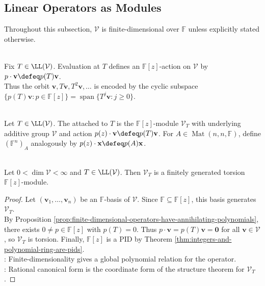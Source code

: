 \subsection{Linear Operators as Modules}

Throughout this subsection, $\mathcal{V}$ is finite-dimensional over $\mathbb{F}$ unless explicitly stated otherwise.

\begin{perspective} \label{per:operator-as-polynomial-action} \\
Fix $T\in\LL(\mathcal{V})$. Evaluation at $T$ defines an $\mathbb{F}[z]$-action on $\mathcal{V}$ by $p\cdot\mathbf{v}\defeq p(T)\mathbf{v}$.\\
Thus the orbit $\mathbf{v},T\mathbf{v},T^2\mathbf{v},\ldots$ is encoded by the cyclic subspace $\{p(T)\mathbf{v}:p\in\mathbb{F}[z]\}=\operatorname{span}\{T^j\mathbf{v}:j\geq0\}$.
\end{perspective}

\begin{definition} \label{def:operator-module-and-matrix-module} \\
Let $T\in\LL(\mathcal{V})$. The  attached to $T$ is the $\mathbb{F}[z]$-module $\mathcal{V}_T$ with underlying additive group $\mathcal{V}$ and action $p(z)\cdot\mathbf{v}\defeq p(T)\mathbf{v}$.
For $A\in\operatorname{Mat}(n,n,\mathbb{F})$, define $(\mathbb{F}^n)_A$ analogously by $p(z)\cdot\mathbf{x}\defeq p(A)\mathbf{x}$.
\end{definition}

\begin{proposition} \label{prop:operator-modules-are-fg-torsion} \\
Let $0<\dim\mathcal{V}<\infty$ and $T\in\LL(\mathcal{V})$. Then $\mathcal{V}_T$ is a finitely generated torsion $\mathbb{F}[z]$-module.
\begin{proof}
Let $(\mathbf{v}_1,\ldots,\mathbf{v}_n)$ be an $\mathbb{F}$-basis of $\mathcal{V}$. Since $\mathbb{F}\subseteq\mathbb{F}[z]$, this basis generates $\mathcal{V}_T$.\\
By Proposition \ref{prop:finite-dimensional-operators-have-annihilating-polynomials}, there exists $0\neq p\in\mathbb{F}[z]$ with $p(T)=0$. Thus $p\cdot\mathbf{v}=p(T)\mathbf{v}=\mathbf{0}$ for all $\mathbf{v}\in\mathcal{V}$, so $\mathcal{V}_T$ is torsion. Finally, $\mathbb{F}[z]$ is a PID by Theorem \ref{thm:integers-and-polynomial-ring-are-pids}.\\
: Finite-dimensionality gives a global polynomial relation for the operator.\\
: Rational canonical form is the coordinate form of the structure theorem for $\mathcal{V}_T$.
\end{proof}
\end{proposition}

